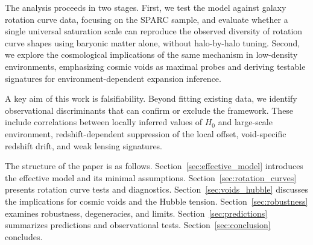   The analysis proceeds in two stages.
  First, we test the model against galaxy rotation curve data, focusing on the
  SPARC sample, and evaluate whether a single universal saturation scale can
  reproduce the observed diversity of rotation curve shapes using baryonic matter
  alone, without halo-by-halo tuning.
  Second, we explore the cosmological implications of the same mechanism in
  low-density environments, emphasizing cosmic voids as maximal probes and
  deriving testable signatures for environment-dependent expansion inference.

  A key aim of this work is falsifiability.
  Beyond fitting existing data, we identify observational discriminants that can
  confirm or exclude the framework.
  These include correlations between locally inferred values of $H_0$ and
  large-scale environment, redshift-dependent suppression of the local offset,
  void-specific redshift drift, and weak lensing signatures.

  The structure of the paper is as follows.
  Section~\ref{sec:effective_model} introduces the effective model and its minimal
  assumptions.
  Section~\ref{sec:rotation_curves} presents rotation curve tests and diagnostics.
  Section~\ref{sec:voids_hubble} discusses the implications for cosmic voids and
  the Hubble tension.
  Section~\ref{sec:robustness} examines robustness, degeneracies, and limits.
  Section~\ref{sec:predictions} summarizes predictions and observational tests.
  Section~\ref{sec:conclusion} concludes.
